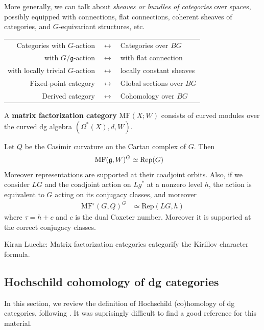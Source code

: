 \documentclass[12pt]{article}
\begin{document}
\medskip
More generally, we can talk about \emph{sheaves or bundles of categories} over spaces,
possibly equipped with connections, flat connections, coherent sheaves of categories,
and $G$-equivariant structures, etc.

\medskip
\begin{center}
\begin{tabular}{rcl}
Categories with $G$-action & $\longleftrightarrow$ & Categories over $BG$ \\[4pt]
with $G/\mathfrak g$-action & $\longleftrightarrow$ & with flat connection \\[4pt]
with locally trivial $G$-action & $\longleftrightarrow$ & locally constant sheaves \\[4pt]
Fixed-point category & $\longleftrightarrow$ & Global sections over $BG$ \\[4pt]
Derived category & $\longleftrightarrow$ & Cohomology over $BG$
\end{tabular}
\end{center}

\begin{definition}
    A \textbf{matrix factorization category} $\mathrm{MF}(X;W)$
    consists of curved modules over the curved dg algebra
    \((\Omega^*(X), d, W)\).
\end{definition}

\begin{theorem}
     Let $Q$ be the Casimir curvature on the Cartan complex of $G$.
    Then \begin{align*}
        \mathrm{MF}(\mathfrak{g}, W)^G &\simeq \mathrm{Rep}(G) 
    \end{align*}
    Moreover representations are supported at their coadjoint orbits. Also, if we consider $LG$ and the coadjoint action on $Lg^*$ at a nonzero level $h$, the action is equivalent to $G$ acting on its conjugacy classes, and moreover \begin{align*}
        \mathrm{MF}^\tau(G,Q)^G &\simeq \mathrm{Rep}(LG,h)
    \end{align*} where $\tau = h + c$ and $c$ is the dual Coxeter number. Moreover it is supported at the correct conjugacy classes.
\end{theorem}

Kiran Luecke: Matrix factorization categories categorify the Kirillov character formula.
\subsection{Hochschild cohomology of dg categories}
In this section, we review the definition of Hochschild (co)homology of dg categories, following \cite{hochschild}. It was suprisingly difficult to find a good reference for this material.
\end{document}
